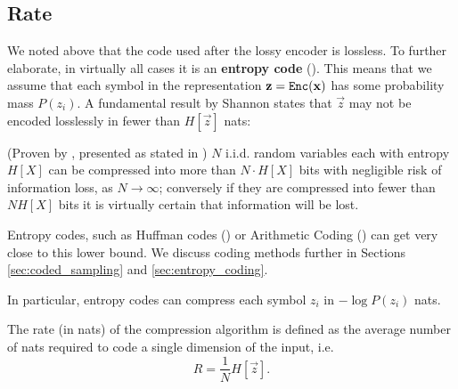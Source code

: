 \subsection{Rate}
We noted above that the code used after the lossy encoder is lossless. To
further elaborate, in virtually all cases it is an \textbf{entropy code}
(\cite{goyal2001theoretical}). This means that we assume that each symbol
in the representation $\mathbf{z} = \mathtt{Enc}(\mathbf{x})$ has some probability mass
$P(z_i)$. A fundamental result by Shannon states that $\vec{z}$ may not be
encoded losslessly in fewer than $H[\vec{z}]$ nats:
\begin{theorem}{(Proven by \cite{shannon1998mathematical}, presented as stated in
    \cite{mackay2003information})}
$N$ i.i.d. random variables each with entropy $H[X]$ can be compressed into more
than $N\cdot H[X]$ bits with negligible risk of information loss, as $N
\rightarrow \infty$; conversely if they are compressed into fewer than $NH[X]$ bits it is virtually certain that information will be lost.
\end{theorem}
Entropy codes, such as Huffman codes (\cite{huffman1952method}) or Arithmetic
Coding (\cite{rissanen1981universal}) can get very close to this lower bound.
We discuss coding methods further in Sections \ref{sec:coded_sampling} and
\ref{sec:entropy_coding}.
\begin{framed}
  In particular, entropy codes can compress each symbol $z_i$ in $-\log P(z_i)$ nats.
\end{framed}
The rate (in nats) of the compression algorithm is defined
as the average number of nats required to code a single dimension of the input, i.e.
\[
  R = \frac{1}{N} H[\vec{z}].
\]
